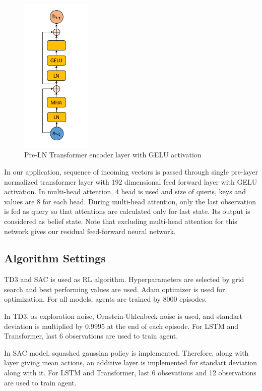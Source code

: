 \documentclass[a4paper, 12pt]{article} %
\begin{document}
\begin{figure}
	\centering
	\includegraphics[width=0.3\textwidth]{figures/ml_theory/transformer_block.png}
	\caption{Pre-LN Transformer encoder layer with GELU activation}
	\label{fig:pre_trsf}
\end{figure}

In our application, sequence of incoming vectors is passed through single pre-layer normalized transformer layer with 192 dimensional feed forward layer with GELU activation. 
In multi-head attention, 4 head is used and size of queris, keys and values are 8 for each head.
During multi-head attention, only the last observation is fed as query so that attentions are calculated only for last state.  
Its output is considered as belief state.
Note that excluding multi-head attention for this network gives our residual feed-forward neural network.

\subsection{Algorithm Settings}
TD3 and SAC is used as RL algorithm. 
Hyperparameters are selected by grid search and best performing values are used. Adam optimizer is used for optimization. 
For all models, agents are trained by 8000 episodes.

In TD3, as exploration noise, Ornstein-Uhlenbeck noise is used, and standart deviation is multiplied  by $0.9995$ at the end of each episode. For LSTM and Transformer, last 6 observations are used to train agent. 

In SAC model, squashed gaussian policy is implemented. 
Therefore, along with layer giving mean actions, an additive layer is implemented for standart deviation along with it. 
For LSTM and Transformer, last 6 obsevations and 12 observations are used to train agent. 
\end{document}
